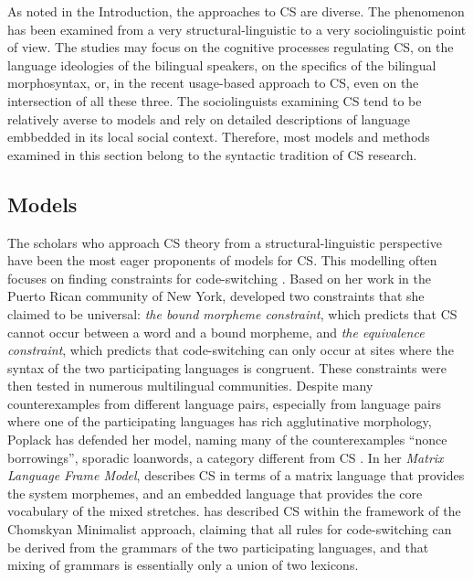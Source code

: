 \documentclass[output=paper,
modfonts
]{langscibook}
\begin{document}
As noted in the Introduction, the approaches to CS are diverse. The phenomenon has been examined from a very structural-linguistic to a very sociolinguistic point of view. The studies may focus on the cognitive processes regulating CS, on the language ideologies of the bilingual speakers, on the specifics of the bilingual morphosyntax, or, in the recent usage-based approach to CS, even on the intersection of all these three. The sociolinguists examining CS tend to be relatively averse to models and rely on detailed descriptions of  language embbedded in its local social context. Therefore, most models and methods examined in this section belong to the syntactic tradition of CS research.

\subsection{Models} \label{subsec-models}

The scholars who approach CS theory from a structural-linguistic perspective have been the most eager proponents of models for CS. This modelling often focuses on finding constraints for code-switching \parencite[pp. 21]{gullberg2009technique}. Based on her work in the Puerto Rican community of New York, \cite{poplack1980sometimes} developed two constraints that she claimed to be universal: \textit{the bound morpheme constraint}, which predicts that CS cannot occur between a word and a bound morpheme, and \textit{the equivalence constraint}, which predicts that code-switching can only occur at sites where the syntax of the two participating languages is congruent. These constraints were then tested in numerous multilingual communities. Despite many counterexamples from different language pairs, especially from language pairs where one of the participating languages has rich agglutinative morphology, Poplack has defended her model, naming many of the counterexamples “nonce borrowings”, sporadic loanwords, a category different from CS \parencite{poplack1998introduction}. In her \textit{Matrix Language Frame Model}, \cite{myers1997duelling} describes CS in terms of a matrix language that provides the system morphemes, and an embedded language that provides the core vocabulary of the mixed stretches. \cite{macswan1999minimalist} has described CS within the framework of the Chomskyan Minimalist approach, claiming that all rules for code-switching can be derived from the grammars of the two participating languages, and that mixing of grammars is essentially only a union of two lexicons. 
\end{document}
